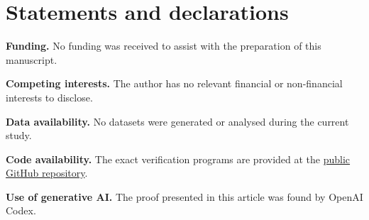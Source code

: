 \documentclass[11pt,reqno]{amsart}
\numberwithin{equation}{section}
\theoremstyle{remark}
\begin{document}
\newpage
\section*{Statements and declarations}

\noindent\textbf{Funding.}
No funding was received to assist with the preparation of this manuscript.

\smallskip
\noindent\textbf{Competing interests.}
The author has no relevant financial or non-financial interests to disclose.

\smallskip
\noindent\textbf{Data availability.}
No datasets were generated or analysed during the current study.

\smallskip
\noindent\textbf{Code availability.}
The exact verification programs are provided at
the \href{https://github.com/huiminZheng-collab/sun-conjecture-2-5-proof-candidate}
{public GitHub repository}.

\smallskip
\noindent\textbf{Use of generative AI.}
The proof presented in this article was found by OpenAI Codex.
\end{document}

